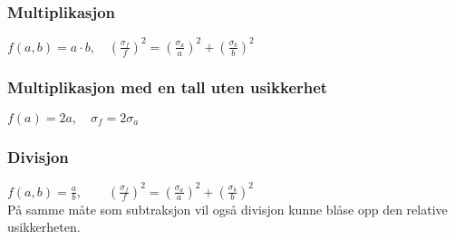\documentclass[a4paper,norsk,12pt]{book}
\begin{document}
\subsubsection*{Multiplikasjon}
$f(a,b) = a\cdot b, 
\quad  \left(\frac{\sigma_f}{f}\right)^2 = \left(\frac{\sigma_a}{a}\right)^2 + \left(\frac{\sigma_b}{b}\right)^2$
\subsubsection*{Multiplikasjon med en tall uten usikkerhet}
$f(a) = 2a, \quad \sigma_f = 2\sigma_a$
\subsubsection*{Divisjon}
$f(a,b) = \frac{a}{b}, \quad 
\quad  \left(\frac{\sigma_f}{f}\right)^2 = \left(\frac{\sigma_a}{a}\right)^2 + \left(\frac{\sigma_b}{b}\right)^2$\\
På samme måte som subtraksjon vil også divisjon kunne blåse opp den relative usikkerheten.
\end{document}
